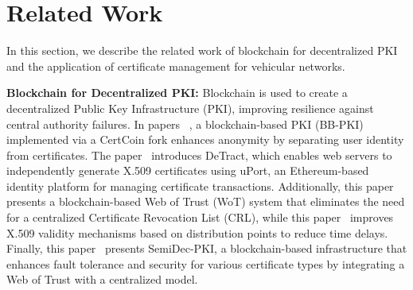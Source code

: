 \section{Related Work}
\label{rw}
In this section, we describe the related work of blockchain for decentralized PKI and the application of certificate management for vehicular networks.

\textbf{Blockchain for Decentralized PKI:} Blockchain is used to create a decentralized Public Key Infrastructure (PKI), improving resilience against central authority failures. In papers ~\cite{plessing2020revisiting, axon2016pb}, a blockchain-based PKI (BB-PKI) implemented via a CertCoin fork enhances anonymity by separating user identity from certificates. The paper~\cite{sermpinis2021detract} introduces DeTract, which enables web servers to independently generate X.509 certificates using uPort, an Ethereum-based identity platform for managing certificate transactions. Additionally, this paper~\cite{toorani2021decentralized} presents a blockchain-based Web of Trust (WoT) system that eliminates the need for a centralized Certificate Revocation List (CRL), while this paper~\cite{adja2021blockchain} improves X.509 validity mechanisms based on distribution points to reduce time delays. Finally, this paper~\cite{turan2024semi} presents SemiDec-PKI, a blockchain-based infrastructure that enhances fault tolerance and security for various certificate types by integrating a Web of Trust with a centralized model.



